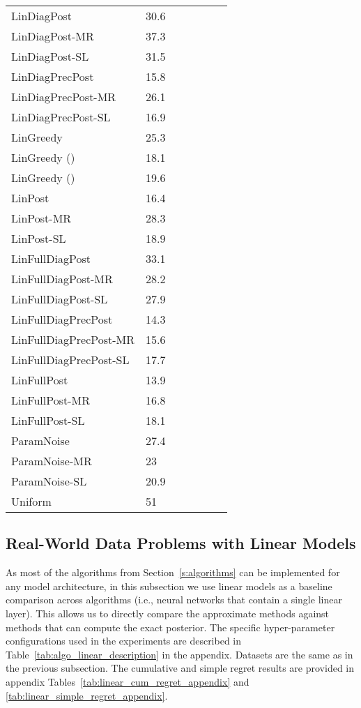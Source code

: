 \documentclass{article} \usepackage{iclr2018_conference,times}
\begin{document}
\begin{table}[ht]
\begin{tabular}{lllllll}
LinDiagPost & 30.6& & & & & \bm{} \\
LinDiagPost-MR & 37.3& & & & &  \\
LinDiagPost-SL & 31.5& & & & &  \\
LinDiagPrecPost & 15.8& & & & & \bm{} \\
LinDiagPrecPost-MR & 26.1& & & & & \bm{} \\
LinDiagPrecPost-SL & 16.9& & & & \bm{}& \bm{} \\
LinGreedy & 25.3& & & & & \bm{} \\
LinGreedy () & 18.1& & & & &  \\
LinGreedy () & 19.6& & & & &  \\
LinPost & 16.4& & & & & \bm{} \\
LinPost-MR & 28.3& & & & & \bm{} \\
LinPost-SL & 18.9& & & & &  \\
LinFullDiagPost & 33.1& & & & &  \\
LinFullDiagPost-MR & 28.2& & & & &  \\
LinFullDiagPost-SL & 27.9& & & & &  \\
LinFullDiagPrecPost & 14.3& & & & &  \\
LinFullDiagPrecPost-MR & 15.6& & & & &  \\
LinFullDiagPrecPost-SL & 17.7& & & & &  \\
LinFullPost & 13.9& & & & &  \\
LinFullPost-MR & 16.8& \bm{}& & & &  \\
LinFullPost-SL & 18.1& & & & &  \\
ParamNoise & 27.4& & & & &  \\
ParamNoise-MR & 23& & & & &  \\
ParamNoise-SL & 20.9& & & & &  \\
Uniform & 51& & & & &  \\
\bottomrule
\end{tabular}
 \end{table}


\subsection{Real-World Data Problems with Linear Models}
As most of the algorithms from Section~\ref{s:algorithms} can be implemented for any model architecture, in this subsection we use linear models as a baseline comparison across algorithms (i.e., neural networks that contain a single linear layer). This allows us to directly compare the approximate methods against methods that can compute the exact posterior. The specific hyper-parameter configurations used in the experiments are described in Table~\ref{tab:algo_linear_description} in the appendix. Datasets are the same as in the previous subsection. The cumulative and simple regret results are provided in appendix Tables~\ref{tab:linear_cum_regret_appendix} and \ref{tab:linear_simple_regret_appendix}.
\end{document}
